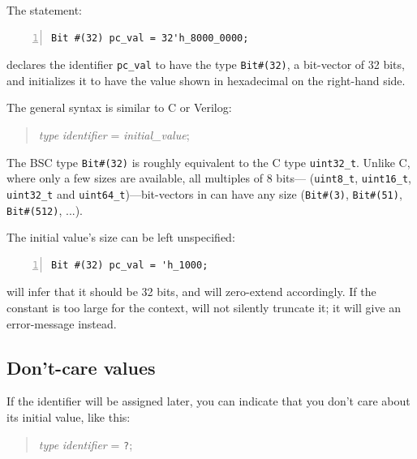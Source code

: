 The {\BSV} statement:

{\footnotesize
\begin{Verbatim}[frame=single, numbers=left]
   Bit #(32) pc_val = 32'h_8000_0000;
\end{Verbatim}
}

declares the identifier \verb|pc_val| to have the type
\verb|Bit#(32)|, {\ie} a bit-vector of 32 bits, and initializes it to
have the value shown in hexadecimal on the right-hand side.

The general syntax is similar to C or Verilog:
\begin{quote}
\emph{type} \emph{identifier} = \emph{initial\_value};
\end{quote}

The BSC type \verb|Bit#(32)| is roughly equivalent to the C type
\verb|uint32_t|.  Unlike C, where only a few sizes are available, all
multiples of 8 bits--- (\verb|uint8_t|, \verb|uint16_t|,
\verb|uint32_t| and \verb|uint64_t|)---bit-vectors in {\BSV} can have any
size (\verb|Bit#(3)|, \verb|Bit#(51)|, \verb|Bit#(512)|, ...).

The initial value's size can be left unspecified:

{\footnotesize
\begin{Verbatim}[frame=single, numbers=left]
   Bit #(32) pc_val = 'h_1000;
\end{Verbatim}
}

{\bsc} will infer that it should be 32 bits, and will zero-extend
accordingly.  If the constant is too large for the context, {\bsc}
will not silently truncate it; it will give an error-message instead.


\subsection{Don't-care values} 

\label{Sec_Dont_Care_Values}


If the identifier will be assigned later, you can indicate that you
don't care about its initial value, like this:

\begin{quote}
\emph{type} \emph{identifier} = {\tt ?};
\end{quote}

